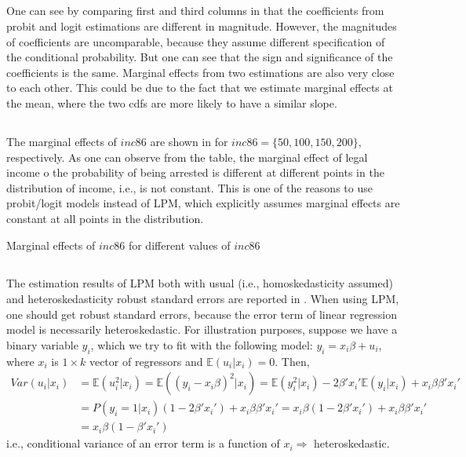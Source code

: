 \documentclass[]{article}
\begin{document}
\subsection{}
One can see by comparing first and third columns in  that the coefficients from probit and logit estimations are different in magnitude. However, the magnitudes of coefficients are uncomparable, because they assume different specification of the conditional probability. But one can see that the sign and significance of the coefficients is the same. Marginal effects from two estimations are also very close to each other. This could be due to the fact that we estimate marginal effects at the mean, where the two cdfs are more likely to have a similar slope.

\subsection{}
The marginal effects of $inc86$ are shown in  for $inc86 = \{50, 100, 150, 200\}$, respectively. As one can observe from the table, the marginal effect of legal income o the probability of being arrested is different at different points in the distribution of income, i.e., is not constant. This is one of the reasons to use probit/logit models instead of LPM, which explicitly assumes marginal effects are constant at all points in the distribution.
\begin{table}[h]
	\centering
	
	\caption{Marginal effects of $inc86$ for different values of $inc86$}
	\label{tab:ex2marinc}
\end{table}

\subsection{}
The estimation results of LPM both with usual (i.e., homoskedasticity assumed) and heteroskedasticity robust standard errors are reported in . When using LPM, one should get robust standard errors, because the error term of linear regression model is necessarily heteroskedastic. For illustration purposes, suppose we have a binary variable $y_i$, which we try to fit with the following model: $y_i = x_i\beta + u_i$, where $x_i$ is $1\times k$ vector of regressors and $\mathbb{E}(u_i|x_i) = 0$. Then,
\begin{equation}
	\begin{split}
		Var(u_i|x_i)& = \mathbb{E}(u_i^2|x_i) = \mathbb{E}((y_i - x_i\beta)^2|x_i) = \mathbb{E}(y_i^2|x_i) - 2\beta'x_i'\mathbb{E}(y_i|x_i) + x_i\beta\beta'x_i' \nonumber \\
		& = P(y_i = 1|x_i)(1 - 2\beta'x_i') + x_i\beta\beta'x_i' = x_i\beta(1 - 2\beta'x_i') + x_i\beta\beta'x_i' \\
		& = x_i\beta(1 - \beta'x_i')
	\end{split}
\end{equation}
i.e., conditional variance of an error term is a function of $x_i \Rightarrow$ heteroskedastic.
\end{document}
